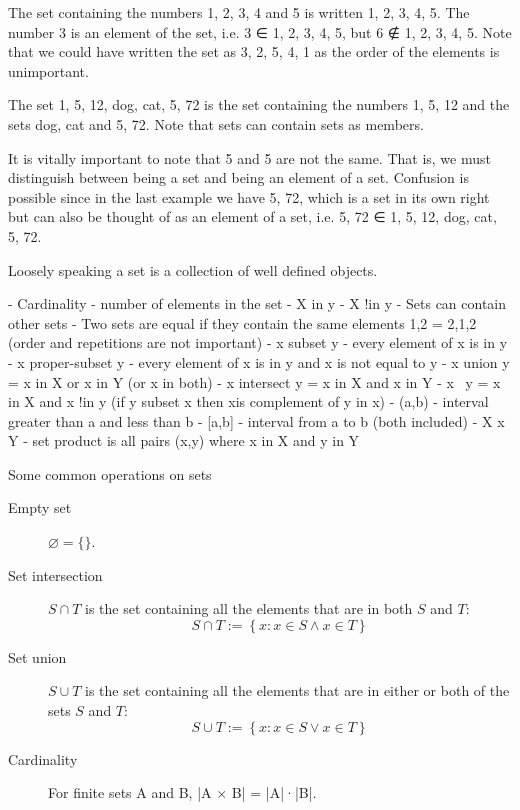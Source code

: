 The set containing the numbers 1, 2, 3, 4 and 5 is written {1, 2, 3, 4, 5}. The number 3 is an element of the set, i.e. 3 ∈ {1, 2, 3, 4, 5}, but 6 ∉ {1, 2, 3, 4, 5}. Note that we could have written the set as {3, 2, 5, 4, 1} as the order of the elements is unimportant.

The set {1, 5, 12, {dog, cat}, {5, 72}} is the set containing the numbers 1, 5, 12 and the sets {dog, cat} and {5, 72}. Note that sets can contain sets as members.

It is vitally important to note that {5} and 5 are not the same. That is, we must distinguish between being a set and being an element of a set. Confusion is possible since in the last example we have {5, 72}, which is a set in its own right but can also be thought of as an element of a set, i.e. {5, 72} ∈ {1, 5, 12, {dog, cat}, {5, 72}}.


Loosely speaking a set is a collection of well defined objects. 

    - Cardinality - number of elements in the set
    - X in y
    - X !in y
    - Sets can contain other sets
    - Two sets are equal if they contain the same elements {1,2} = {2,1,2} (order and repetitions are not important)
    - x subset y - every element of x is in y
    - x proper-subset y - every element of x is in y and x is not equal to y
    - x union y = x in X or x in Y (or x in both)
    - x intersect y = x in X and x in Y
    - x \ y = x in X and x !in y (if y subset x then x\y is complement of y in x)
    - (a,b) - interval greater than a and less than b
    - [a,b] - interval from a to b (both included)
    - X x Y - set product is all pairs (x,y) where x in X and y in Y

Some common operations on sets
\begin{description}
\item[Empty set] $\varnothing = \{\}$.
\item[Set intersection] $S \cap T$ is the set containing all the elements that are in both $S$ and $T$:
\begin{equation}
S \cap T := \left\{{x: x \in S \land x \in T}\right\}
\end{equation}
\item[Set union] $S \cup T$ is the set containing all the elements that are in either or both of the sets $S$ and $T$:
\begin{equation}
S \cup T := \left\{{x: x \in S \lor x \in T}\right\}
\end{equation}
\item[Cardinality] For finite sets A and B, |A × B| = |A|·|B|. 
\end{description}

